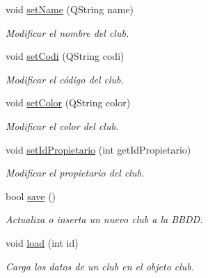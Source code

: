 \begin{DoxyCompactItemize}
void \mbox{\hyperlink{classclub_a7c1e4e25822c9e54407dcad080e8c59a}{set\+Name}} (Q\+String name)
\begin{DoxyCompactList}\small\item\em Modificar el nombre del club. \end{DoxyCompactList}\item 
void \mbox{\hyperlink{classclub_af845385d60a9833c6c9ce50929a134a8}{set\+Codi}} (Q\+String codi)
\begin{DoxyCompactList}\small\item\em Modificar el código del club. \end{DoxyCompactList}\item 
void \mbox{\hyperlink{classclub_ac29fce99b2429c5645a85c595528fc9a}{set\+Color}} (Q\+String color)
\begin{DoxyCompactList}\small\item\em Modificar el color del club. \end{DoxyCompactList}\item 
void \mbox{\hyperlink{classclub_ae1e13f2514221a45c7d566bbad4bd188}{set\+Id\+Propietario}} (int get\+Id\+Propietario)
\begin{DoxyCompactList}\small\item\em Modificar el propietario del club. \end{DoxyCompactList}\item 
bool \mbox{\hyperlink{classclub_a88805452e8d11cbe90d377321ec40779}{save}} ()
\begin{DoxyCompactList}\small\item\em Actualiza o inserta un nuevo club a la B\+B\+DD. \end{DoxyCompactList}\item 
void \mbox{\hyperlink{classclub_a689d67e008113cbb123c5f0c4c19166e}{load}} (int id)
\begin{DoxyCompactList}\small\item\em Carga los datos de un club en el objeto club. \end{DoxyCompactList}\end{DoxyCompactItemize}
